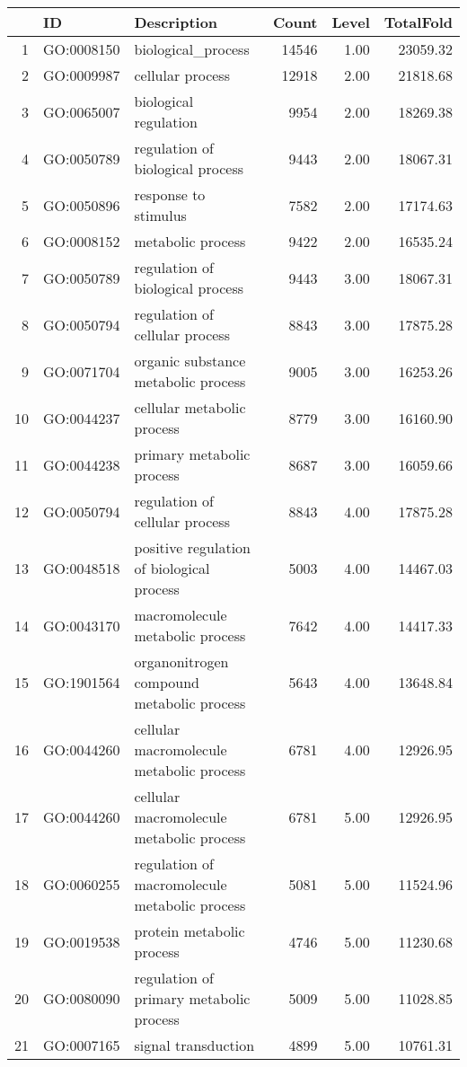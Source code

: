 \begin{table}[ht]
\centering
\begin{tabular}{rllrrr}
  \hline
 & ID & Description & Count & Level & TotalFold \\ 
  \hline
1 & GO:0008150 & biological\_process & 14546 & 1.00 & 23059.32 \\ 
  2 & GO:0009987 & cellular process & 12918 & 2.00 & 21818.68 \\ 
  3 & GO:0065007 & biological regulation & 9954 & 2.00 & 18269.38 \\ 
  4 & GO:0050789 & regulation of biological process & 9443 & 2.00 & 18067.31 \\ 
  5 & GO:0050896 & response to stimulus & 7582 & 2.00 & 17174.63 \\ 
  6 & GO:0008152 & metabolic process & 9422 & 2.00 & 16535.24 \\ 
  7 & GO:0050789 & regulation of biological process & 9443 & 3.00 & 18067.31 \\ 
  8 & GO:0050794 & regulation of cellular process & 8843 & 3.00 & 17875.28 \\ 
  9 & GO:0071704 & organic substance metabolic process & 9005 & 3.00 & 16253.26 \\ 
  10 & GO:0044237 & cellular metabolic process & 8779 & 3.00 & 16160.90 \\ 
  11 & GO:0044238 & primary metabolic process & 8687 & 3.00 & 16059.66 \\ 
  12 & GO:0050794 & regulation of cellular process & 8843 & 4.00 & 17875.28 \\ 
  13 & GO:0048518 & positive regulation of biological process & 5003 & 4.00 & 14467.03 \\ 
  14 & GO:0043170 & macromolecule metabolic process & 7642 & 4.00 & 14417.33 \\ 
  15 & GO:1901564 & organonitrogen compound metabolic process & 5643 & 4.00 & 13648.84 \\ 
  16 & GO:0044260 & cellular macromolecule metabolic process & 6781 & 4.00 & 12926.95 \\ 
  17 & GO:0044260 & cellular macromolecule metabolic process & 6781 & 5.00 & 12926.95 \\ 
  18 & GO:0060255 & regulation of macromolecule metabolic process & 5081 & 5.00 & 11524.96 \\ 
  19 & GO:0019538 & protein metabolic process & 4746 & 5.00 & 11230.68 \\ 
  20 & GO:0080090 & regulation of primary metabolic process & 5009 & 5.00 & 11028.85 \\ 
  21 & GO:0007165 & signal transduction & 4899 & 5.00 & 10761.31 \\ 
   \hline
\end{tabular}
\end{table}
